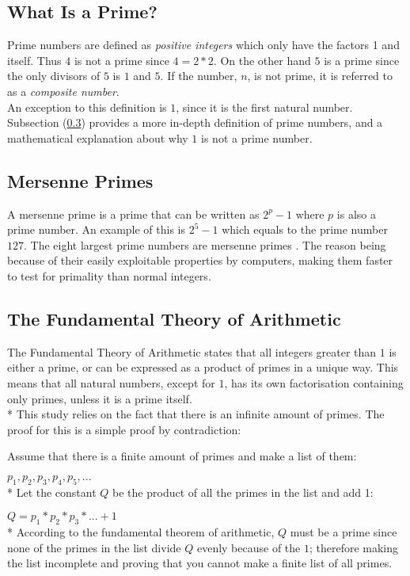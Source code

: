 \documentclass[main.tex]{subfiles}
\begin{document}
\subsection{What Is a Prime?}
Prime numbers are defined as \textit{positive integers} which only have the
factors 1 and itself. Thus $4$ is not a prime since $4 = 2 * 2$. On the other
hand $5$ is a prime since the only divisors of $5$ is $1$ and $5$. If the
number, $n$, is not prime, it is referred to as a \textit{composite number}. \\

An exception to this definition is $1$, since it is the first natural number.
Subsection (\ref{arithmetic}) provides a more in-depth definition of prime
numbers, and a mathematical explanation about why $1$ is not a prime number.

\subsection{Mersenne Primes}
A mersenne prime is a prime that can be written as $2^{p}-1$ where $p$ is also a
prime number. An example of this is $2^5-1$ which equals to the prime number
$127$. The eight largest prime numbers are mersenne primes
\cite{prime:largest_digits}. The reason being because of their easily
exploitable properties by computers, making them faster to test for primality
than normal integers.

\subsection{The Fundamental Theory of Arithmetic} \label{arithmetic} The
Fundamental Theory of Arithmetic \cite{theorem:arithmetic} states that all
integers greater than $1$ is either a prime, or can be expressed as a product of
primes in a unique way. This means that all natural numbers, except for $1$, has
its own factorisation containing only primes, unless it is a prime itself.
\newline
\\*
This study relies on the fact that there is an infinite amount of primes. The
proof for this is a simple proof by contradiction:

\begin{mdframed}
  Assume that there is a finite amount of primes and make a list of them:

  $p_1, p_2, p_3, p_4, p_5, ...$ \newline
  \\*
  Let the constant $Q$ be the product of all the primes in the list and add 1:

  $Q = p_1 * p_2 * p_3 * ... + 1$ \newline
  \\*
  According to the fundamental theorem of arithmetic, $Q$ must be a prime since
  none of the primes in the list divide $Q$ evenly because of the $1$; therefore
  making the list incomplete and proving that you cannot make a finite list of
  all primes.
\end{mdframed}
\end{document}
